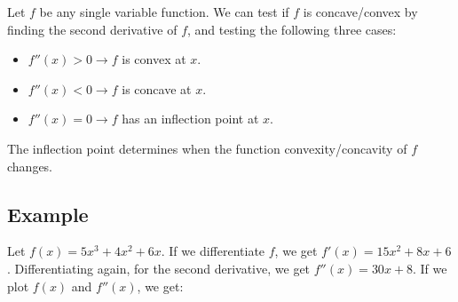 \documentclass[11pt]{article}
\providecommand{\tightlist}{%
      \setlength{\itemsep}{0pt}\setlength{\parskip}{0pt}}
\begin{document}
    Let \(f\) be any single variable function. We can test if \(f\) is
concave/convex by finding the second derivative of \(f\), and testing
the following three cases:

\begin{itemize}
\tightlist
\item
  \(f''(x) > 0 \rightarrow f\) is convex at \(x\).
\item
  \(f''(x) < 0 \rightarrow f\) is concave at \(x\).
\item
  \(f''(x) = 0 \rightarrow f\) has an inflection point at \(x\).
\end{itemize}

The inflection point determines when the function convexity/concavity of
\(f\) changes.

\hypertarget{example}{%
\subsection{Example}\label{example}}

Let \(f(x)=5x^3 + 4x^2 + 6x\). If we differentiate \(f\), we get
\(f'(x)=15x^2+8x+6\). Differentiating again, for the second derivative,
we get \(f''(x)=30x+8\). If we plot \(f(x)\) and \(f''(x)\), we get:
\end{document}

